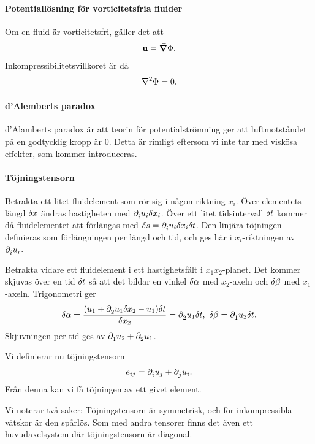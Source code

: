 \paragraph{Potentiallösning för vorticitetsfria fluider}
Om en fluid är vorticitetsfri, gäller det att
\begin{align*}
	\vb{u} = \grad{\Phi}.
\end{align*}
Inkompressibilitetsvillkoret är då
\begin{align*}
	\laplacian{\Phi} = 0.
\end{align*}

\paragraph{d'Alemberts paradox}
d'Alamberts paradox är att teorin för potentialströmning ger att luftmotståndet på en godtycklig kropp är $0$. Detta är rimligt eftersom vi inte tar med viskösa effekter, som kommer introduceras.

\paragraph{Töjningstensorn}
Betrakta ett litet fluidelement som rör sig i någon riktning $x_{i}$. Över elementets längd $\delta x$ ändras hastigheten med $\partial_{i}^{}u_{i}\delta x_{i}$. Över ett litet tidsintervall $\delta t$ kommer då fluidelementet att förlängas med $\delta s = \partial_{i}^{}u_{i}\delta x_{i}\delta t$. Den linjära töjningen definieras som förlängningen per längd och tid, och ges här i $x_{i}$-riktningen av $\partial_{i}^{}u_{i}$.

Betrakta vidare ett fluidelement i ett hastighetsfält i $x_{1}x_{2}$-planet. Det kommer skjuvas över en tid $\delta t$ så att det bildar en vinkel $\delta \alpha$ med $x_{2}$-axeln och $\delta \beta$ med $x_{1}$-axeln. Trigonometri ger
\begin{align*}
	\delta \alpha = \frac{(u_{1} + \partial_{2}^{}u_{1}\delta x_{2} - u_{1})\delta t}{\delta x_{2}} = \partial_{2}^{}u_{1}\delta t,\ \delta \beta = \partial_{1}^{}u_{2}\delta t.
\end{align*}
Skjuvningen per tid ges av $\partial_{1}^{}u_{2} + \partial_{2}^{}u_{1}$.

Vi definierar nu töjningstensorn
\begin{align*}
	e_{ij} = \partial_{i}^{}u_{j} + \partial_{j}^{}u_{i}.
\end{align*}
Från denna kan vi få töjningen av ett givet element.

Vi noterar två saker: Töjningstensorn är symmetrisk, och för inkompressibla vätskor är den spårlös. Som med andra tensorer finns det även ett huvudaxelsystem där töjningstensorn är diagonal.

